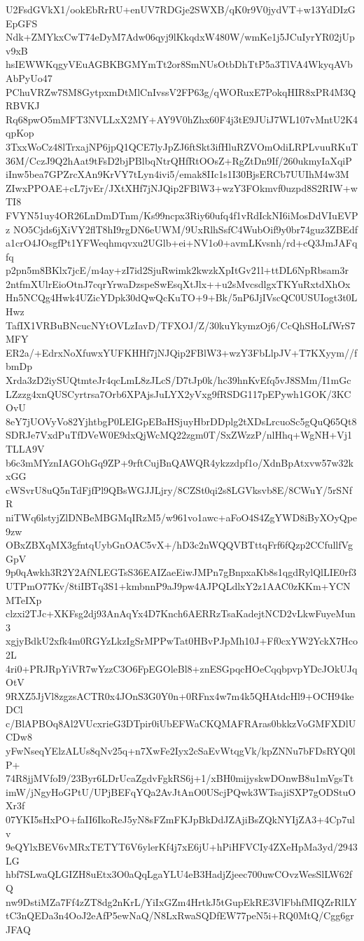 U2FsdGVkX1/ookEbRrRU+enUV7RDGje2SWXB/qK0r9V0jydVT+w13YdDIzGEpGFS
Ndk+ZMYkxCwT74eDyM7Adw06qyj9lKkqdxW480W/wmKe1j5JCuIyrYR02jUpv9xB
hsIEWWKqgyVEuAGBKBGMYmTt2or8SmNUsOtbDhTtP5a3TlVA4WkyqAVbAbPyUo47
PChuVRZw7SM8GytpxmDtMlCnIvssV2FP63g/qWORuxE7PokqHIR8xPR4M3QRBVKJ
Rq68pwO5mMFT3NVLLxX2MY+AY9V0hZhx60F4j3tE9JUiJ7WL107vMntU2K4qpKop
3TxxWoCz48lTrxajNP6jpQ1QCE7lyJpZJ6ftSkt3ifHluRZVOmOdiLRPLvuuRKuT
36M/CczJ9Q2hAat9tFsD2bjPBlbqNtrQHfRtOOsZ+RgZtDn9If/260ukmyIaXqiP
iInw5bea7GPZrcXAn9KrVY7tLyn4ivi5/emak8IIc1s1I30BjsERCb7UUIhM4w3M
ZIwxPPOAE+cL7jvEr/JXtXHf7jNJQip2FBlW3+wzY3FOkmvf0uzpd8S2RIW+wTI8
FVYN51uy4OR26LnDmDTnm/Ks99ncpx3Riy60ufq4f1vRdIckNI6iMosDdVIuEVPz
NO5Cjds6jXiVY2flT8hI9rgDN6eUWM/9UxRlhSsfC4WubOif9y0br74guz3ZBEdf
a1crO4JOsgfPt1YFWeqhmqvxu2UGlb+ei+NV1o0+avmLKvsnh/rd+cQ3JmJAFqfq
p2pn5m8BKlx7jcE/m4ay+zI7id2SjuRwimk2kwzkXpItGv21l+ttDL6NpRbsam3r
2ntfmXUlrEioOtnJ7cqrYrwaDzspeSwEsqXtJlx++u2sMvcsdlgxTKYuRxtdXhOx
Hn5NCQg4Hwk4UZicYDpk30dQwQcKuTO+9+Bk/5nP6JjIVscQC0USUIogt3t0LHwz
TafIX1VRBuBNcucNYtOVLzIavD/TFXOJ/Z/30kuYkymzOj6/CcQhSHoLfWrS7MFY
ER2a/+EdrxNoXfuwxYUFKHHf7jNJQip2FBlW3+wzY3FbLlpJV+T7KXyym//fbmDp
Xrda3zD2iySUQtmteJr4qcLmL8zJLcS/D7tJp0k/hc39hnKvEfq5vJ8SMm/I1mGc
LZzzg4xnQUSCyrtrsa7Orb6XPAjsJuLYX2yVxg9fRSDG117pEPywh1GOK/3KCOvU
8eY7jUOVyVo82YjhtbgP0LEIGpEBaHSjuyHbrDDplg2tXDsLrcuoSc5gQuQ65Qt8
SDRJe7VxdPuTfDVeW0E9dxQjWcMQ22zgm0T/SxZWzzP/nlHhq+WgNH+Vj1TLLA9V
b6c3mMYznIAGOhGq9ZP+9rftCujBnQAWQR4ykzzdpf1o/XdnBpAtxvw57w32kxGG
cWSvrU8uQ5nTdFjfPl9QBsWGJJLjry/8CZSt0qi2s8LGVksvb8E/8CWuY/5rSNfR
niTWq6lstyjZlDNBeMBGMqIRzM5/w961vo1awc+aFoO4S4ZgYWD8iByXOyQpe9zw
OBxZBXqMX3gfntqUybGnOAC5vX+/hD3c2nWQQVBTttqFrf6fQzp2CCfullfVgGpV
9p0qAwkh3R2Y2AfNLEGTsS36EAIZaeEiwJMPn7gBnpxaKb8s1qgdRylQlLIE0rf3
UTPmO77Kv/8tiIBTq3S1+kmbnnP9aJ9pw4AJPQLdlxY2z1AAC0zKKm+YCNMTeIXp
clzxi2TJc+XKFsg2dj93AnAqYx4D7Knch6AERRzTsaKadejtNCD2vLkwFuyeMun3
xgjyBdkU2xfk4m0RGYzLkzIgSrMPPwTat0HBvPJpMh10J+Ff0cxYW2YckX7Hco2L
4ri0+PRJRpYiVR7wYzzC3O6FpEGOleBl8+znESGpqcHOeCqqbpvpYDcJOkUJqOtV
9RXZ5JjVl8zgzsACTR0x4JOnS3G0Y0n+0RFnx4w7m4k5QHAtdcHl9+OCH94keDCl
c/BlAPBOq8Al2VUcxrieG3DTpir0iUbEFWaCKQMAFRAras0bkkzVoGMFXDlUCDw8
yFwNseqYElzALUs8qNv25q+n7XwFe2Iyx2cSaEvWtqgVk/kpZNNu7bFDsRYQ0lP+
74R8jjMVfoI9/23Byr6LDrUcaZgdvFgkRS6j+1/xBH0mijyskwDOnwB8u1mVgsTt
imW/jNgyHoGPtU/UPjBEFqYQa2AvJtAnO0UScjPQwk3WTsajiSXP7gODStuOXr3f
07YKI5sHxPO+faII6IkoReJ5yN8sFZmFKJpBkDdJZAjiBsZQkNYIjZA3+4Cp7ulv
9eQYlxBEV6vMRxTETYT6V6ylerKf4j7xE6jU+hPiHFVCIy4ZXeHpMa3yd/2943LG
hbf7SLwaQLGIZH8uEtx3O0aQqLgaYLU4eB3HadjZjeec700uwCOvzWesSlLW62fQ
nw9DstiMZa7Ff4zZT8dg2nKrL/YiIxGZm4HrtkJ5tGupEkRE3VlFbhfMIQZrRlLY
tC3nQEDa3n4OoJ2eAfP5ewNaQ/N8LxRwaSQDfEW77peN5i+RQ0MtQ/Cgg6grJFAQ
